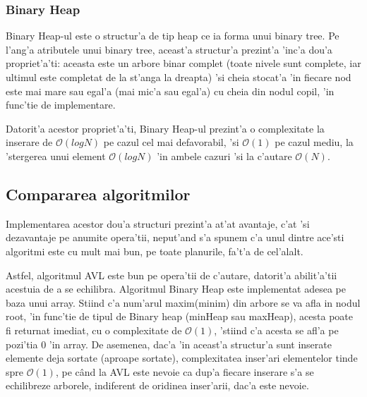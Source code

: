 \documentclass[titlepage,12pt]{article}
\numberwithin{figure}{section}
\begin{document}
\subsubsection{Binary Heap}
Binary Heap-ul este o structur'a de tip heap ce ia forma unui binary tree. Pe l'ang'a atributele unui binary tree, aceast'a structur'a prezint'a 'inc'a dou'a propriet'a'ti: aceasta este un arbore binar complet (toate nivele sunt complete, iar ultimul este completat de la st'anga la dreapta) 'si cheia stocat'a 'in fiecare nod este mai mare sau egal'a (mai mic'a sau egal'a) cu cheia din nodul copil, 'in func'tie de implementare. 
	\par Datorit'a acestor propriet'a'ti, Binary Heap-ul prezint'a o complexitate la inserare de \textbf{$\mathcal{O}(log N)$} pe cazul cel mai defavorabil, 'si $\mathcal{O}(1)$ pe cazul mediu, la 'stergerea unui element $\mathcal{O}(log N)$ 'in ambele cazuri 'si la c'autare $\mathcal{O}(N)$.

\subsection{Compararea algoritmilor} 
\par Implementarea acestor dou'a structuri prezint'a at'at avantaje, c'at 'si dezavantaje pe anumite opera'tii, neput'and s'a spunem c'a unul dintre ace'sti algoritmi este cu mult mai bun, pe toate planurile, fa't'a de cel'alalt.
\par Astfel, algoritmul AVL este bun pe opera'tii de c'autare, datorit'a abilit'a'tii acestuia de a se echilibra. Algoritmul Binary Heap este implementat adesea pe baza unui array. Stiind c'a num'arul maxim(minim) din arbore se va afla in nodul root, 'in func'tie de tipul de Binary heap (minHeap sau maxHeap), acesta poate fi returnat imediat, cu o complexitate de $\mathcal{O}(1)$, 'stiind c'a acesta se afl'a pe pozi'tia 0 'in array. De asemenea, dac'a 'in aceast'a structur'a sunt inserate elemente deja sortate (aproape sortate), complexitatea inser'ari elementelor tinde spre $\mathcal{O}(1)$, pe c\^and la AVL este nevoie ca dup'a fiecare inserare s'a se echilibreze arborele, indiferent de oridinea inser'arii, dac'a este nevoie.
\end{document}
